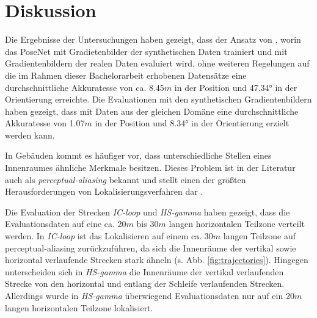 
\section{Diskussion}
\label{sec:kapitel_5}

Die Ergebnisse der Untersuchungen haben gezeigt, dass der Ansatz von \citet{acharyaBIMPoseNetIndoorCamera2019}, worin das PoseNet mit Gradietenbilder der synthetischen Daten trainiert und mit Gradientenbildern der realen Daten evaluiert wird, ohne weiteren Regelungen auf die im Rahmen dieser Bachelorarbeit erhobenen Datensätze eine durchschnittliche Akkuratesse von ca. 8.45$m$ in der Position und 47.34° in der Orientierung erreichte. Die Evaluationen mit den synthetischen Gradientenbildern haben gezeigt, dass mit Daten aus der gleichen Domäne eine durchschnittliche Akkuratesse von 1.07$m$ in der Position und 8.34° in der Orientierung erzielt werden kann. 


In Gebäuden kommt es häufiger vor, dass unterschiedliche Stellen eines Innenraumes ähnliche Merkmale besitzen. Dieses Problem ist in der Literatur auch als \textit{perceptual-aliasing} bekannt und stellt einen der größten Herausforderungen von Lokalisierungsverfahren dar \cite{lowryVisualPlaceRecognition2016}.


Die Evaluation der Strecken \textit{IC-loop} und \textit{HS-gamma} haben gezeigt, dass die Evaluationsdaten auf eine ca. 20$m$ bis 30$m$ langen horizontalen Teilzone verteilt werden. In \textit{IC-loop} ist das Lokalisieren auf einem ca. 30$m$ langen Teilzone auf perceptual-aliasing zurückzuführen, da sich die Innenräume der vertikal sowie horizontal verlaufende Strecken stark ähneln (s. Abb. \ref{fig:trajectories}). Hingegen unterscheiden sich in \textit{HS-gamma} die Innenräume der vertikal verlaufenden Strecke von den horizontal und entlang der Schleife verlaufenden Strecken. Allerdings wurde in \textit{HS-gamma} überwiegend Evaluationsdaten nur auf ein 20$m$ langen horizontalen Teilzone lokalisiert.


%



% 




